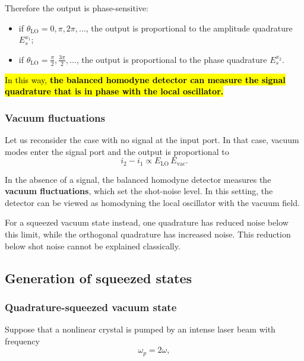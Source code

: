 \begin{enumerate}
    Therefore the output is phase-sensitive:
    \begin{itemize}
        \item if $\theta_\text{LO}=0,\pi,2\pi,\dots$, the output is proportional to the amplitude quadrature $E_s^{x_1}$;
        \item if $\theta_\text{LO}=\frac{\pi}{2},\frac{3\pi}{2},\dots$, the output is proportional to the phase quadrature $E_s^{x_2}$.
    \end{itemize}

    \hl{In this way, \textbf{the balanced homodyne detector can measure the signal quadrature that is in phase with the local oscillator.}}
\end{enumerate}

\subsubsection{Vacuum fluctuations}

Let us reconsider the case with no signal at the input port. In that case, vacuum modes enter the signal port and the output is proportional to
\[
i_2-i_1 \propto E_\text{LO}\,E_{\mathrm{vac}}.
\]

In the absence of a signal, the balanced homodyne detector measures the \textbf{vacuum fluctuations}, which set the shot-noise level. In this setting, the detector can be viewed as homodyning the local oscillator with the vacuum field. 

For a squeezed vacuum state instead, one quadrature has reduced noise below this limit, while the orthogonal quadrature has increased noise. This reduction below shot noise cannot be explained classically. 


\subsection{Generation of squeezed states}

\subsubsection{Quadrature-squeezed vacuum state}

Suppose that a nonlinear crystal is pumped by an intense laser beam with frequency
\begin{equation}\label{eqn:14-pump-frequency}
\omega_p=2\omega,
\end{equation}

